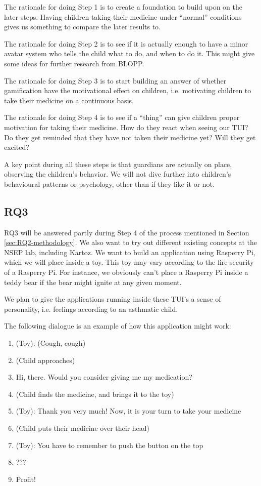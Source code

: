 The rationale for doing Step 1 is to create a foundation to build upon on the later steps. Having children taking their medicine under ``normal'' conditions gives us something to compare the later results to. 


The rationale for doing Step 2 is to see if it is actually enough to have a minor avatar system who tells the child what to do, and when to do it. This might give some ideas for further research from BLOPP. 


The rationale for doing Step 3 is to start building an answer of whether gamification have the motivational effect on children, i.e. motivating children to take their medicine on a continuous basis. 


The rationale for doing Step 4 is to see if a ``thing'' can give children proper motivation for taking their medicine. How do they react when seeing our TUI? Do they get reminded that they have not taken their medicine yet? Will they get excited? 


A key point during all these steps is that guardians are actually on place, observing the children's behavior. We will not dive further into children's behavioural patterns or psychology, other than if they like it or not.    
     
 
\subsection{RQ3}
\label{sec:RQ3-methodology}

RQ3 will be answered partly during Step 4 of the process mentioned in Section \ref{sec:RQ2-methodology}. We also want to try out different existing concepts at the NSEP lab, including Kartoz. We want to build an application using Rasperry Pi, which we will place inside a toy. This toy may vary according to the fire security of a Rasperry Pi. For instance, we obviously can't place a Rasperry Pi inside a teddy bear if the bear might ignite at any given moment.


We plan to give the applications running inside these TUI's a sense of personality, i.e. feelings according to an asthmatic child. 


The following dialogue is an example of how this application might work:
\begin{enumerate}
  \item (Toy): (Cough, cough)
  \item (Child approaches)
  \item Hi, there. Would you consider giving me my medication?
  \item (Child finds the medicine, and brings it to the toy)
  \item (Toy): Thank you very much! Now, it is your turn to take your medicine
  \item (Child puts their medicine over their head)
  \item (Toy): You have to remember to push the button on the top
  \item ???
  \item Profit!
\end{enumerate} 
